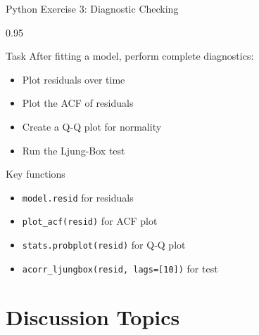 \documentclass[9pt, aspectratio=169, t]{beamer}
\begin{document}
\begin{frame}{Python Exercise 3: Diagnostic Checking}
    \begin{cminipage}{0.95\textwidth}
    \begin{alertblock}{Task}
        After fitting a model, perform complete diagnostics:
        \begin{itemize}\setlength{\itemsep}{0pt}
            \item Plot residuals over time
            \item Plot the ACF of residuals
            \item Create a Q-Q plot for normality
            \item Run the Ljung-Box test
        \end{itemize}
    \end{alertblock}

    \vspace{0.2cm}
    \begin{exampleblock}{Key functions}
        \begin{itemize}\setlength{\itemsep}{0pt}
            \item \texttt{model.resid} for residuals
            \item \texttt{plot\_acf(resid)} for ACF plot
            \item \texttt{stats.probplot(resid)} for Q-Q plot
            \item \texttt{acorr\_ljungbox(resid, lags=[10])} for test
        \end{itemize}
    \end{exampleblock}
    \end{cminipage}
\end{frame}

\section{Discussion Topics}
\end{document}
